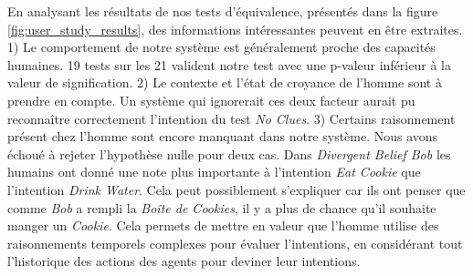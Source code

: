 \documentclass[a4paper,11pt,twoside]{StyleThese}
\begin{document}
En analysant les résultats de nos tests d'équivalence, présentés dans la figure \ref{fig:user_study_results}, des informations intéressantes peuvent en être extraites. 1) Le comportement de notre système est généralement proche des capacités humaines. 19 tests sur les 21 valident notre test avec une p-valeur inférieur à la valeur de signification. 2) Le contexte et l'état de croyance de l'homme sont à prendre en compte. Un système qui ignorerait ces deux facteur aurait pu reconnaître correctement l'intention du test \textit{No Clues}. 3) Certains raisonnement présent chez l'homme sont encore manquant dans notre système. Nous avons échoué à rejeter l'hypothèse nulle pour deux cas. Dans \textit{Divergent Belief Bob} les humains ont donné une note plus importante à l'intention \textit{Eat Cookie} que l'intention \textit{Drink Water}. Cela peut possiblement s'expliquer car ils ont penser que comme \textit{Bob} a rempli la \textit{Boîte de Cookies}, il y a plus de chance qu'il souhaite manger un \textit{Cookie}. Cela permets de mettre en valeur que l'homme utilise des raisonnements temporels complexes pour évaluer l'intentions, en considérant tout l'historique des actions des agents pour deviner leur intentions.
\end{document}

